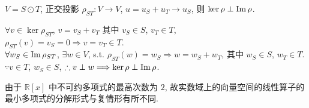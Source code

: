 \documentclass{note}
\begin{document}
\begin{cor}\label{cor-10.1}
    $V=S\odot T$, 正交投影 $\rho_{ST}:V\rightarrow V$, $u=u_S+u_T\rightarrow u_S$, 则 $\ker\rho\perp\operatorname{Im}\rho$.
\end{cor}
\begin{pf}
    $\forall v\in\ker\rho_{ST}$, $v=v_S+v_T$ 其中 $v_S\in S$, $v_T\in T$,\\
    $\rho_{ST}(v)=v_S=0\Longrightarrow v=v_T\in T$.\\
    $\forall w_S\in\operatorname{Im}\rho_{ST}$, $\exists w\in V$, s.t. $\rho_{ST}(w)=w_S\Longrightarrow w=w_S+w_T$, 其中 $w_S\in S$, $w_T\in T$.\\
    $\because v\in T$, $w_S\in S$, $\therefore v\perp w\Longrightarrow\ker\rho\perp\operatorname{Im}\rho$.
\end{pf}

由于 $\mathbb{R}[x]$ 中不可约多项式的最高次数为 $2$, 故实数域上的向量空间的线性算子的最小多项式的分解形式与复情形有所不同.
\end{document}
